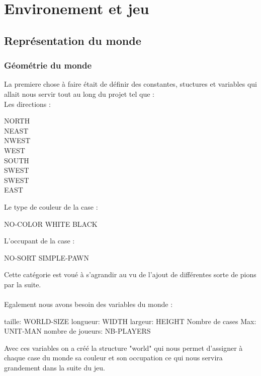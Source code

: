 \chapter{Environement et jeu}

\section{Représentation du monde}
\subsection{Géométrie du monde}

        La premiere chose à faire était de définir des constantes, stuctures et variables qui allait nous servir tout au long du projet tel que : \\
        Les directions :
        \\
        \begin{center}
        \begin{multicols}{2}
        
            NORTH \\ NEAST  \\ NWEST \\ WEST \\ SOUTH \\ SWEST \\ SWEST \\ EAST  
        
        \end{multicols}
        \end{center} 
        Le type de couleur de la case :
        \begin{center}
            NO-COLOR \hspace{1cm} WHITE \hspace{1cm} BLACK \\
        \end{center}
        L'occupant de la case :
        \begin{center}
            NO-SORT \hspace{2cm} SIMPLE-PAWN \\ 
        \end{center}
        Cette catégorie est voué à s'agrandir au vu de l'ajout de différentes sorte de pions par la suite. \\\\
        Egalement nous avons besoin des variables du monde :
        \begin{center}
            taille: WORLD-SIZE longueur: WIDTH largeur: HEIGHT Nombre de cases Max: UNIT-MAN nombre de joueurs: NB-PLAYERS
        \end{center}
        Avec ces variables on a créé la structure "world" qui nous permet d'assigner à chaque case du monde sa couleur et son occupation ce qui nous servira grandement dans la suite du jeu.\\
